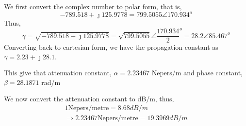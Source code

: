 \begin{exmp}
We first convert the complex number to polar form, that is,
\begin{equation*}
-789.518 + \jmath 125.9778 = 799.5055\angle 170.934^o
\end{equation*}
Thus,
\begin{dmath*}
\gamma = \sqrt{-789.518 + \jmath 125.9778}
= \sqrt{799.5055}\angle {\frac{170.934}{2}}^o
=28.2\angle 85.467^o
\end{dmath*}
Converting back to cartesian form, we have the propagation constant as $\gamma=2.23 +\jmath 28.1$.

This give that attenuation constant, $\alpha = 2.23467 $ Nepers/m and phase constant, $ \beta = 28.1871 $ rad/m

We now convert the attenuation constant to dB/m, thus,
\begin{align*}
1 \text{Nepers/metre} = 8.68dB/m\\
\Rightarrow 2.23467 \text{Nepers/metre} = 19.3969 dB/m
\end{align*}
\end{exmp} 

